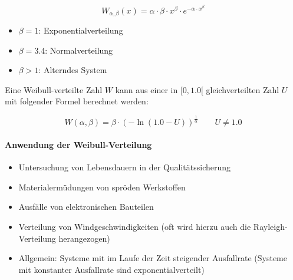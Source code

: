 \begin{equation}
	W_{\alpha,\beta}(x) = \alpha \cdot \beta \cdot x^\beta \cdot e^{-\alpha \cdot x^\beta} 
\end{equation}

\begin{itemize}
	\item $\beta = 1$:  Exponentialverteilung
	\item $\beta = 3.4$:  Normalverteilung
	\item $\beta > 1$:  Alterndes System
\end{itemize}

Eine Weibull-verteilte Zahl $W$ kann aus einer in $[0, 1.0[$ gleichverteilten Zahl $U$ mit folgender Formel berechnet werden:

\begin{equation}
	W(\alpha,\beta) = \beta \cdot (-\ln(1.0-U))^\frac{1}{\alpha}  \qquad U \neq 1.0
\end{equation}

\paragraph{Anwendung der Weibull-Verteilung}
\begin{itemize}
	\item Untersuchung von Lebensdauern in der Qualitätssicherung
	\item Materialermüdungen von spröden Werkstoffen
	\item Ausfälle von elektronischen Bauteilen
	\item Verteilung von Windgeschwindigkeiten (oft wird hierzu auch die Rayleigh-Verteilung herangezogen)
	\item Allgemein: Systeme mit im Laufe der Zeit steigender Ausfallrate (Systeme mit konstanter Ausfallrate sind exponentialverteilt)
\end{itemize}
